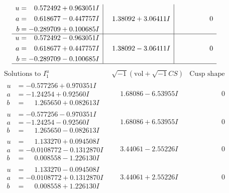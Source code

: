 \documentclass[1p]{elsarticle_modified}
\theoremstyle{definition}
\newcommand{\I}{\sqrt{-1}}
\begin{document}
$$\begin{array}{c|c|c}
\begin{aligned}
u &= \phantom{-}0.572492 + 0.963051 I \\
a &= \phantom{-}0.618677 - 0.447757 I \\
b &= -0.289709 + 0.100685 I\end{aligned}
 & \phantom{-}1.38092 + 3.06411 I & \phantom{-0.000000 } 0 \\ \hline\begin{aligned}
u &= \phantom{-}0.572492 - 0.963051 I \\
a &= \phantom{-}0.618677 + 0.447757 I \\
b &= -0.289709 - 0.100685 I\end{aligned}
 & \phantom{-}1.38092 - 3.06411 I & \phantom{-0.000000 } 0\\
 \hline 
 \end{array}$$\newpage$$\begin{array}{c|c|c}  
\text{Solutions to }I^u_{1}& \I (\text{vol} + \sqrt{-1}CS) & \text{Cusp shape}\\
 \hline 
\begin{aligned}
u &= -0.577256 + 0.970351 I \\
a &= -1.24254 + 0.92560 I \\
b &= \phantom{-}1.265650 + 0.082613 I\end{aligned}
 & \phantom{-}1.68086 - 6.53955 I & \phantom{-0.000000 } 0 \\ \hline\begin{aligned}
u &= -0.577256 - 0.970351 I \\
a &= -1.24254 - 0.92560 I \\
b &= \phantom{-}1.265650 - 0.082613 I\end{aligned}
 & \phantom{-}1.68086 + 6.53955 I & \phantom{-0.000000 } 0 \\ \hline\begin{aligned}
u &= \phantom{-}1.133270 + 0.094508 I \\
a &= -0.0108772 - 0.1312870 I \\
b &= \phantom{-}0.008558 - 1.226130 I\end{aligned}
 & \phantom{-}3.44061 - 2.55226 I & \phantom{-0.000000 } 0 \\ \hline\begin{aligned}
u &= \phantom{-}1.133270 - 0.094508 I \\
a &= -0.0108772 + 0.1312870 I \\
b &= \phantom{-}0.008558 + 1.226130 I\end{aligned}
 & \phantom{-}3.44061 + 2.55226 I & \phantom{-0.000000 } 0 \\ \hline\begin{aligned}

\end{aligned}
\end{array}$$
\end{document}
